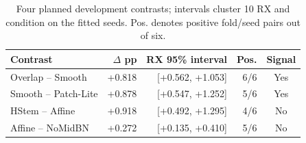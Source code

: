 \begin{table}[t]
\centering\caption{Four planned development contrasts; intervals cluster 10 RX and condition on the fitted seeds. Pos. denotes positive fold/seed pairs out of six.}
\label{tab:contrasts}
\setlength{\tabcolsep}{3pt}\footnotesize
\begin{tabular}{lrrrc}
\toprule Contrast & $\Delta$ pp & RX 95\% interval & Pos. & Signal\\\midrule
Overlap -- Smooth & +0.818 & [+0.562, +1.053] & 6/6 & Yes\\
Smooth -- Patch-Lite & +0.878 & [+0.547, +1.252] & 5/6 & Yes\\
HStem -- Affine & +0.918 & [+0.492, +1.295] & 4/6 & No\\
Affine -- NoMidBN & +0.272 & [+0.135, +0.410] & 5/6 & No\\
\bottomrule\end{tabular}
\end{table}
